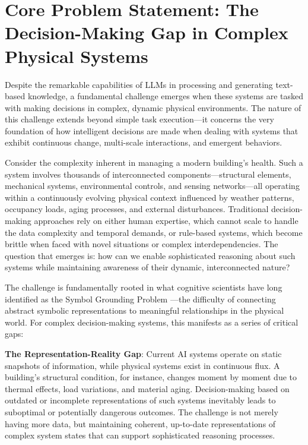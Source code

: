 \section{Core Problem Statement: The Decision-Making Gap in Complex Physical Systems}

Despite the remarkable capabilities of LLMs in processing and generating text-based knowledge, a fundamental challenge emerges when these systems are tasked with making decisions in complex, dynamic physical environments. The nature of this challenge extends beyond simple task execution—it concerns the very foundation of how intelligent decisions are made when dealing with systems that exhibit continuous change, multi-scale interactions, and emergent behaviors.

Consider the complexity inherent in managing a modern building's health. Such a system involves thousands of interconnected components—structural elements, mechanical systems, environmental controls, and sensing networks—all operating within a continuously evolving physical context influenced by weather patterns, occupancy loads, aging processes, and external disturbances. Traditional decision-making approaches rely on either human expertise, which cannot scale to handle the data complexity and temporal demands, or rule-based systems, which become brittle when faced with novel situations or complex interdependencies. The question that emerges is: how can we enable sophisticated reasoning about such systems while maintaining awareness of their dynamic, interconnected nature?

The challenge is fundamentally rooted in what cognitive scientists have long identified as the Symbol Grounding Problem \cite{harnad1990symbol, searle1980minds}—the difficulty of connecting abstract symbolic representations to meaningful relationships in the physical world. For complex decision-making systems, this manifests as a series of critical gaps:

\textbf{The Representation-Reality Gap}: Current AI systems operate on static snapshots of information, while physical systems exist in continuous flux. A building's structural condition, for instance, changes moment by moment due to thermal effects, load variations, and material aging. Decision-making based on outdated or incomplete representations of such systems inevitably leads to suboptimal or potentially dangerous outcomes. The challenge is not merely having more data, but maintaining coherent, up-to-date representations of complex system states that can support sophisticated reasoning processes.

